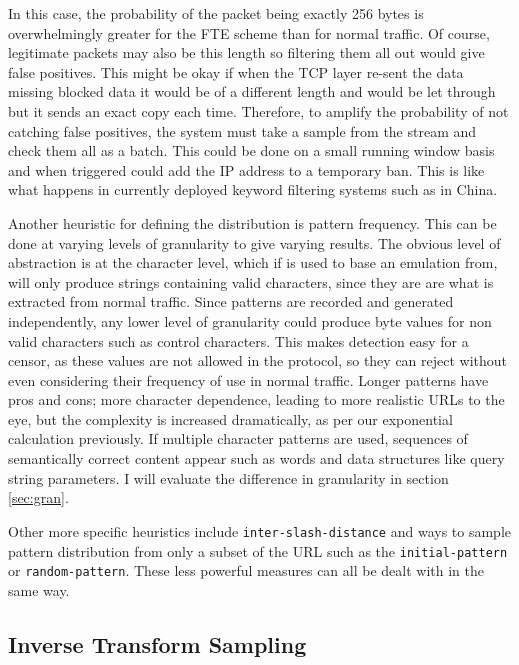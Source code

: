 \documentclass[10pt,a4paper]{article}
\begin{document}
In this case, the probability of the packet being exactly 256 bytes is overwhelmingly greater for the FTE scheme than for normal traffic.
Of course, legitimate packets may also be this length so filtering them all out would give false positives.
This might be okay if when the TCP layer re-sent the data missing blocked data it would be of a different length and would be let through but it sends an exact copy each time.
Therefore, to amplify the probability of not catching false positives, the system must take a sample from the stream and check them all as a batch.
This could be done on a small running window basis and when triggered could add the IP address to a temporary ban.
This is like what happens in currently deployed keyword filtering systems such as in China. 

Another heuristic for defining the distribution is pattern frequency.
This can be done at varying levels of granularity to give varying results.
The obvious level of abstraction is at the character level, which if is used to base an emulation from, will only produce strings containing valid characters, since they are are what is extracted from normal traffic.
Since patterns are recorded and generated independently, any lower level of granularity could produce byte values for non valid characters such as control characters.
This makes detection easy for a censor, as these values are not allowed in the protocol, so they can reject without even considering their frequency of use in normal traffic.
Longer patterns have pros and cons; more character dependence, leading to more realistic URLs to the eye, but the complexity is increased dramatically, as per our exponential calculation previously.
If multiple character patterns are used, sequences of semantically correct content appear such as words and data structures like query string parameters.
I will evaluate the difference in granularity in section \ref{sec:gran}.

Other more specific heuristics include \texttt{inter-slash-distance} and ways to sample pattern distribution from only a subset of the URL such as the \texttt{initial-pattern} or \texttt{random-pattern}. These less powerful measures can all be dealt with in the same way.

\subsection{Inverse Transform Sampling}
\end{document}
